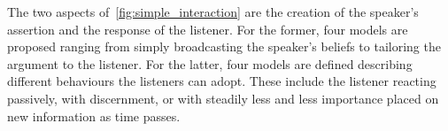 The two aspects of~\cref{fig:simple_interaction} are the creation of the speaker's assertion and the response of the listener. For the former, four models are proposed ranging from simply broadcasting the speaker's beliefs to tailoring the argument to the listener. For the latter, four models are defined describing different behaviours the listeners can adopt. These include the listener reacting passively, with discernment, or with steadily less and less importance placed on new information as time passes.







